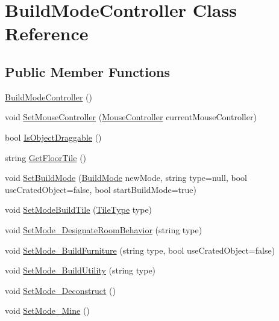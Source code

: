 \hypertarget{class_build_mode_controller}{}\section{Build\+Mode\+Controller Class Reference}
\label{class_build_mode_controller}
\subsection*{Public Member Functions}
\begin{DoxyCompactItemize}
\item 
\hyperlink{class_build_mode_controller_aebdab45886f7d5596c93615e35b7ffa4}{Build\+Mode\+Controller} ()
\item 
void \hyperlink{class_build_mode_controller_aeff1dc27c03ea6b305e96cd27479e4f0}{Set\+Mouse\+Controller} (\hyperlink{class_mouse_controller}{Mouse\+Controller} current\+Mouse\+Controller)
\item 
bool \hyperlink{class_build_mode_controller_afa05334c74ecba755e41508ac035725b}{Is\+Object\+Draggable} ()
\item 
string \hyperlink{class_build_mode_controller_a43ac9aa9dbe863ce1072848d095ed6d5}{Get\+Floor\+Tile} ()
\item 
void \hyperlink{class_build_mode_controller_a0958b997758652d8248fa44c77203ad2}{Set\+Build\+Mode} (\hyperlink{_build_mode_controller_8cs_a9c6873c2efeb065f633a16b39a5841bd}{Build\+Mode} new\+Mode, string type=null, bool use\+Crated\+Object=false, bool start\+Build\+Mode=true)
\item 
void \hyperlink{class_build_mode_controller_a15f5663c50eb333203de7c643eae6079}{Set\+Mode\+Build\+Tile} (\hyperlink{class_tile_type}{Tile\+Type} type)
\item 
void \hyperlink{class_build_mode_controller_a3efe18c3fb374c2acc5f389486f10f90}{Set\+Mode\+\_\+\+Designate\+Room\+Behavior} (string type)
\item 
void \hyperlink{class_build_mode_controller_a1290bf6ed004c20fcc676dfe804d4724}{Set\+Mode\+\_\+\+Build\+Furniture} (string type, bool use\+Crated\+Object=false)
\item 
void \hyperlink{class_build_mode_controller_a914bc417c126e01bd62ae59e45fcad92}{Set\+Mode\+\_\+\+Build\+Utility} (string type)
\item 
void \hyperlink{class_build_mode_controller_ae9e998ff515c9af0a7f1d0ac1b46b403}{Set\+Mode\+\_\+\+Deconstruct} ()
\item 
void \hyperlink{class_build_mode_controller_a895c0c5021e532b32fdc28d9c8c45c1b}{Set\+Mode\+\_\+\+Mine} ()

\end{DoxyCompactItemize}
